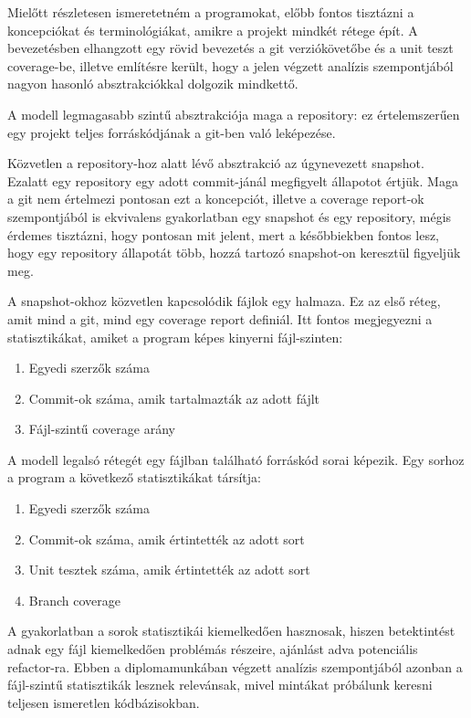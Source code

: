 Mielőtt részletesen ismeretetném a programokat, előbb fontos tisztázni a koncepciókat és terminológiákat, amikre a projekt mindkét rétege épít. A bevezetésben elhangzott egy rövid bevezetés a git verziókövetőbe és a unit teszt coverage-be, illetve említésre került, hogy a jelen végzett analízis szempontjából nagyon hasonló absztrakciókkal dolgozik mindkettő.

A modell legmagasabb szintű absztrakciója maga a repository: ez értelemszerűen egy projekt teljes forráskódjának a git-ben való leképezése.

Közvetlen a repository-hoz alatt lévő absztrakció az úgynevezett snapshot. Ezalatt egy repository egy adott commit-jánál megfigyelt állapotot értjük. Maga a git nem értelmezi pontosan ezt a koncepciót, illetve a coverage report-ok szempontjából is ekvivalens gyakorlatban egy snapshot és egy repository, mégis érdemes tisztázni, hogy pontosan mit jelent, mert a későbbiekben fontos lesz, hogy egy repository állapotát több, hozzá tartozó snapshot-on keresztül figyeljük meg.

A snapshot-okhoz közvetlen kapcsolódik fájlok egy halmaza. Ez az első réteg, amit mind a git, mind egy coverage report definiál. Itt fontos megjegyezni a statisztikákat, amiket a program képes kinyerni fájl-szinten:
\begin{enumerate}
    \item Egyedi szerzők száma
    \item Commit-ok száma, amik tartalmazták az adott fájlt
    \item Fájl-szintű coverage arány
\end{enumerate}

A modell legalsó rétegét egy fájlban található forráskód sorai képezik. Egy sorhoz a program a következő statisztikákat társítja:
\begin{enumerate}
    \item Egyedi szerzők száma
    \item Commit-ok száma, amik értintették az adott sort
    \item Unit tesztek száma, amik értintették az adott sort
    \item Branch coverage
\end{enumerate}

A gyakorlatban a sorok statisztikái kiemelkedően hasznosak, hiszen betektintést adnak egy fájl kiemelkedően problémás részeire, ajánlást adva potenciális refactor-ra. Ebben a diplomamunkában végzett analízis szempontjából azonban a fájl-szintű statisztikák lesznek relevánsak, mivel mintákat próbálunk keresni teljesen ismeretlen kódbázisokban.


